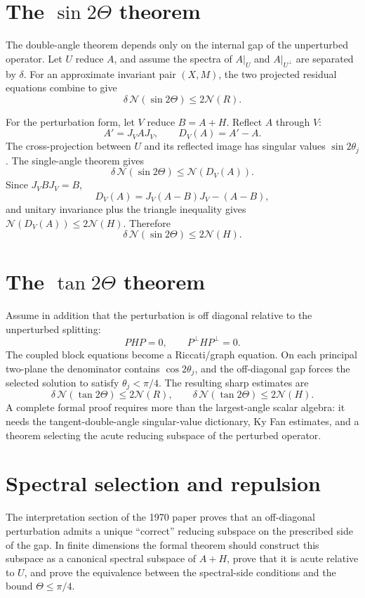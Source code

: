 \documentclass[11pt]{article}
\newcommand{\Nn}{\mathcal N}
\theoremstyle{remark}
\begin{document}
\section{The \texorpdfstring{$\sin 2\Theta$}{sin 2 Theta} theorem}

The double-angle theorem depends only on the internal gap of the unperturbed
operator.  Let \(U\) reduce \(A\), and assume the spectra of
\(A|_U\) and \(A|_{U^\perp}\) are separated by \(\delta\).  For an approximate
invariant pair \((X,M)\), the two projected residual equations combine to give
\[
  \delta\,\Nn(\sin 2\Theta)\le 2\Nn(R).
\]

For the perturbation form, let \(V\) reduce \(B=A+H\).  Reflect \(A\) through
\(V\):
\[
  A'=J_VAJ_V,\qquad D_V(A)=A'-A.
\]
The cross-projection between \(U\) and its reflected image has singular values
\(\sin 2\theta_j\).  The single-angle theorem gives
\[
  \delta\,\Nn(\sin 2\Theta)\le\Nn(D_V(A)).
\]
Since \(J_VBJ_V=B\),
\[
  D_V(A)=J_V(A-B)J_V-(A-B),
\]
and unitary invariance plus the triangle inequality gives
\(\Nn(D_V(A))\le2\Nn(H)\).  Therefore
\[
  \delta\,\Nn(\sin 2\Theta)\le2\Nn(H).
\]

\section{The \texorpdfstring{$\tan 2\Theta$}{tan 2 Theta} theorem}

Assume in addition that the perturbation is off diagonal relative to the
unperturbed splitting:
\[
  PHP=0,\qquad P^\perp H P^\perp=0.
\]
The coupled block equations become a Riccati/graph equation.  On each principal
two-plane the denominator contains \(\cos 2\theta_j\), and the off-diagonal gap
forces the selected solution to satisfy \(\theta_j<\pi/4\).  The resulting
sharp estimates are
\[
  \delta\,\Nn(\tan 2\Theta)\le2\Nn(R),
  \qquad
  \delta\,\Nn(\tan 2\Theta)\le2\Nn(H).
\]
A complete formal proof requires more than the largest-angle scalar algebra:
it needs the tangent-double-angle singular-value dictionary, Ky Fan estimates,
and a theorem selecting the acute reducing subspace of the perturbed operator.

\section{Spectral selection and repulsion}

The interpretation section of the 1970 paper proves that an off-diagonal
perturbation admits a unique ``correct'' reducing subspace on the prescribed
side of the gap.  In finite dimensions the formal theorem should construct this
subspace as a canonical spectral subspace of \(A+H\), prove that it is acute
relative to \(U\), and prove the equivalence between the spectral-side
conditions and the bound \(\Theta\le\pi/4\).
\end{document}
